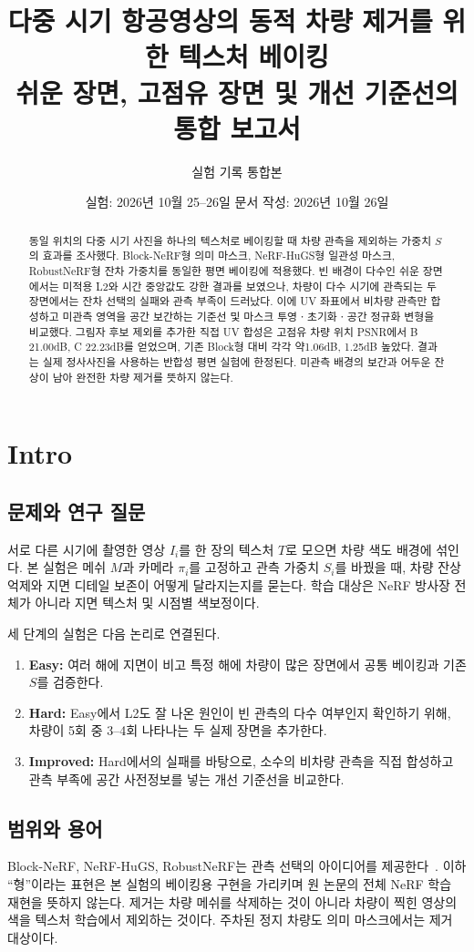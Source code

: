 \documentclass[11pt,a4paper]{article}
\title{다중 시기 항공영상의 동적 차량 제거를 위한 텍스처 베이킹\\\large 쉬운 장면, 고점유 장면 및 개선 기준선의 통합 보고서}
\author{실험 기록 통합본}
\date{실험: 2026년 10월 25--26일 \quad 문서 작성: 2026년 10월 26일}
\begin{document}
\maketitle
\begin{abstract}
동일 위치의 다중 시기 사진을 하나의 텍스처로 베이킹할 때 차량 관측을 제외하는 가중치 $S$의 효과를 조사했다. Block-NeRF형 의미 마스크, NeRF-HuGS형 일관성 마스크, RobustNeRF형 잔차 가중치를 동일한 평면 베이킹에 적용했다. 빈 배경이 다수인 쉬운 장면에서는 미적용 L2와 시간 중앙값도 강한 결과를 보였으나, 차량이 다수 시기에 관측되는 두 장면에서는 잔차 선택의 실패와 관측 부족이 드러났다. 이에 UV 좌표에서 비차량 관측만 합성하고 미관측 영역을 공간 보간하는 기준선 및 마스크 투영ㆍ초기화ㆍ공간 정규화 변형을 비교했다. 그림자 후보 제외를 추가한 직접 UV 합성은 고점유 차량 위치 PSNR에서 B 21.00dB, C 22.23dB를 얻었으며, 기존 Block형 대비 각각 약1.06dB, 1.25dB 높았다. 결과는 실제 정사사진을 사용하는 반합성 평면 실험에 한정된다. 미관측 배경의 보간과 어두운 잔상이 남아 완전한 차량 제거를 뜻하지 않는다.
\end{abstract}
\tableofcontents
\clearpage
\section{Intro}
\subsection{문제와 연구 질문}
서로 다른 시기에 촬영한 영상 $I_i$를 한 장의 텍스처 $T$로 모으면 차량 색도 배경에 섞인다. 본 실험은 메쉬 $M$과 카메라 $\pi_i$를 고정하고 관측 가중치 $S_i$를 바꿨을 때, 차량 잔상 억제와 지면 디테일 보존이 어떻게 달라지는지를 묻는다. 학습 대상은 NeRF 방사장 전체가 아니라 지면 텍스처 및 시점별 색보정이다.

세 단계의 실험은 다음 논리로 연결된다.
\begin{enumerate}
\item \textbf{Easy:} 여러 해에 지면이 비고 특정 해에 차량이 많은 장면에서 공통 베이킹과 기존 $S$를 검증한다.
\item \textbf{Hard:} Easy에서 L2도 잘 나온 원인이 빈 관측의 다수 여부인지 확인하기 위해, 차량이 5회 중 3--4회 나타나는 두 실제 장면을 추가한다.
\item \textbf{Improved:} Hard에서의 실패를 바탕으로, 소수의 비차량 관측을 직접 합성하고 관측 부족에 공간 사전정보를 넣는 개선 기준선을 비교한다.
\end{enumerate}

\subsection{범위와 용어}
Block-NeRF, NeRF-HuGS, RobustNeRF는 관측 선택의 아이디어를 제공한다~\cite{block,hugs,robust}. 이하 ``형''이라는 표현은 본 실험의 베이킹용 구현을 가리키며 원 논문의 전체 NeRF 학습 재현을 뜻하지 않는다. 제거는 차량 메쉬를 삭제하는 것이 아니라 차량이 찍힌 영상의 색을 텍스처 학습에서 제외하는 것이다. 주차된 정지 차량도 의미 마스크에서는 제거 대상이다.
\end{document}
